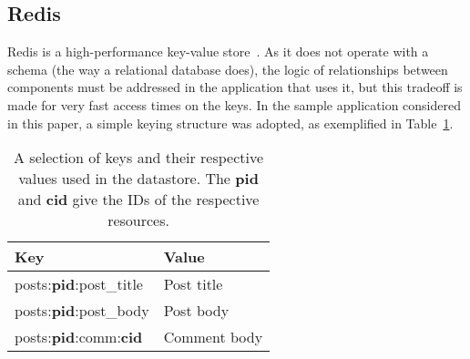 \subsection{\label{sec:impl:redis}Redis}

Redis is a high-performance key-value store~\cite{lerner2010}. As it does not operate with a schema (the way a relational database does), the logic of relationships between components must be addressed in the application that uses it, but this tradeoff is made for very fast access times on the keys. In the sample application considered in this paper, a simple keying structure was adopted, as exemplified in Table~\ref{tab:keys}.

\begin{table}
    \begin{center}
        \begin{tabular}{l l}
            \toprule
            \textbf{Key} & \textbf{Value} \\
            \midrule
            posts:\textbf{pid}:post\_title & Post title \\
            posts:\textbf{pid}:post\_body & Post body \\
            posts:\textbf{pid}:comm:\textbf{cid} & Comment body \\
            \bottomrule
        \end{tabular}
        \caption{A selection of keys and their respective values used in the datastore. The \textbf{pid} and \textbf{cid} give the IDs of the respective resources.}
        \label{tab:keys}
    \end{center}
\end{table}
